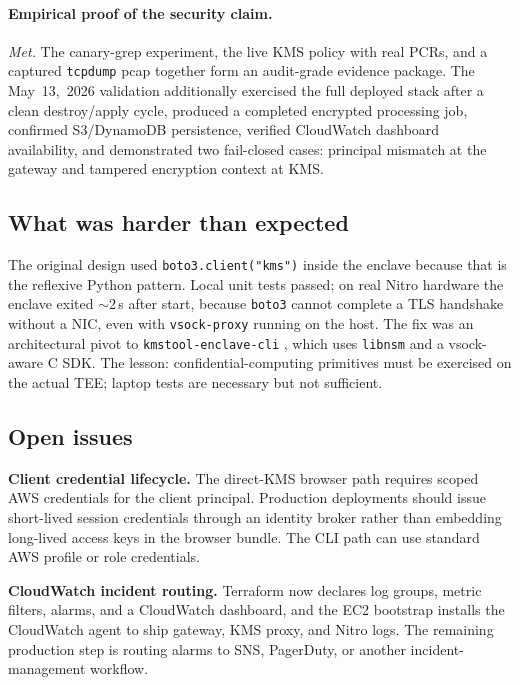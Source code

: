 \documentclass[11pt]{article}
\begin{document}
\paragraph{Empirical proof of the security claim.} \emph{Met.} The
canary-grep experiment, the live KMS policy with real PCRs, and a
captured \texttt{tcpdump} pcap together form an audit-grade
evidence package. The May~13,~2026 validation additionally exercised
the full deployed stack after a clean destroy/apply cycle, produced a
completed encrypted processing job, confirmed S3/DynamoDB persistence,
verified CloudWatch dashboard availability, and demonstrated two
fail-closed cases: principal mismatch at the gateway and tampered
encryption context at KMS.

\subsection{What was harder than expected}\label{sec:lessons}

The original design used \texttt{boto3.client("kms")} inside the
enclave because that is the reflexive Python pattern. Local unit
tests passed; on real Nitro hardware the enclave exited
$\sim$2\,s after start, because \texttt{boto3} cannot complete a
TLS handshake without a NIC, even with \texttt{vsock-proxy}
running on the host. The fix was an architectural pivot to
\texttt{kmstool-enclave-cli} \cite{nitrosdk}, which uses
\texttt{libnsm} and a vsock-aware C SDK. The lesson:
confidential-computing primitives must be exercised on the actual
TEE; laptop tests are necessary but not sufficient.

\subsection{Open issues}\label{sec:limits}

\textbf{Client credential lifecycle.} The direct-KMS browser path
requires scoped AWS credentials for the client principal. Production
deployments should issue short-lived session credentials through an
identity broker rather than embedding long-lived access keys in the
browser bundle. The CLI path can use standard AWS profile or role
credentials.

\textbf{CloudWatch incident routing.} Terraform now declares log
groups, metric filters, alarms, and a CloudWatch dashboard, and the EC2
bootstrap installs the CloudWatch agent to ship gateway, KMS proxy, and
Nitro logs. The remaining production step is routing alarms to SNS,
PagerDuty, or another incident-management workflow.
\end{document}
